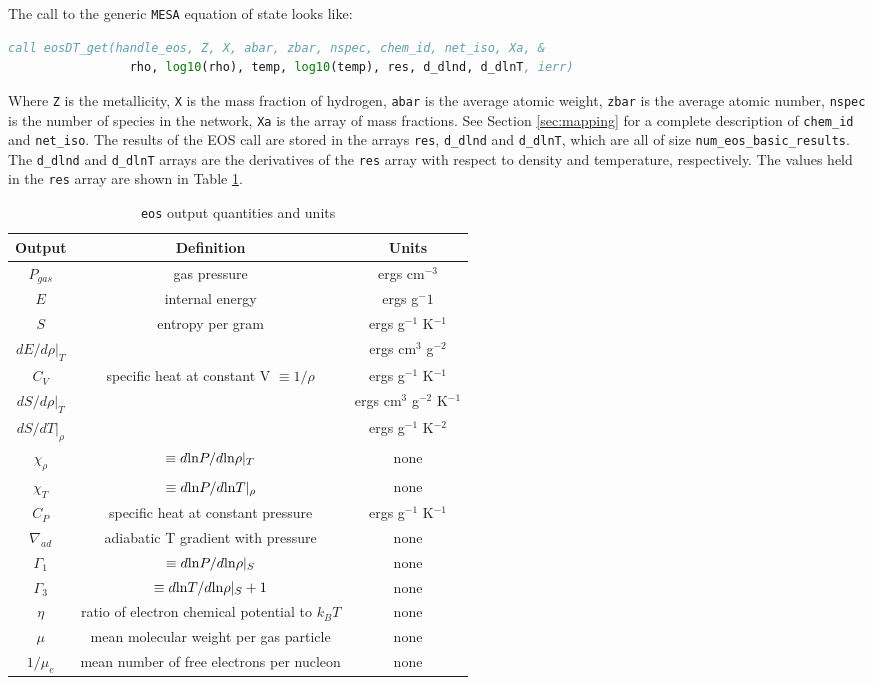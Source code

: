 The call to the generic {\tt MESA} equation of state looks like:
\begin{lstlisting}[language=fortran,mathescape=false]
  call eosDT_get(handle_eos, Z, X, abar, zbar, nspec, chem_id, net_iso, Xa, &
                 rho, log10(rho), temp, log10(temp), res, d_dlnd, d_dlnT, ierr)
\end{lstlisting}
Where {\tt Z} is the metallicity, {\tt X} is the mass fraction of hydrogen, 
{\tt abar} is the average atomic weight, {\tt zbar} is the average atomic 
number, {\tt nspec} is the number of species in the network, {\tt Xa} is 
the array of mass fractions. See Section \ref{sec:mapping} for a complete 
description of {\tt chem\_id} and {\tt net\_iso}. The results of the EOS call 
are stored in the arrays {\tt res}, {\tt d\_dlnd} and {\tt d\_dlnT}, which 
are all of size {\tt num\_eos\_basic\_results}. The {\tt d\_dlnd} and 
{\tt d\_dlnT} arrays are the derivatives of the {\tt res} array with respect 
to density and temperature, respectively. The values held in the {\tt res} 
array are shown in Table \ref{tab:res}.

\begin{table}[h]
\begin{center}
\begin{tabular}{ccc}
Output & Definition & Units \\ \hline
$P_{gas}$ & gas pressure & ergs cm$^{-3}$ \\
$E$ & internal energy & ergs g$^-{1}$ \\
$S$ & entropy per gram & ergs g$^{-1}$ K$^{-1}$ \\
$dE/d\rho|_T$ & & ergs cm$^3$ g$^{-2}$ \\
$C_V$ & specific heat at constant V $\equiv 1/\rho$ & ergs g$^{-1}$ K$^{-1}$ \\
$dS/d\rho|_T$ & & ergs cm$^3$ g$^{-2}$ K$^{-1}$ \\
$dS/dT|_\rho$ & & ergs g$^{-1}$ K$^{-2}$ \\
$\chi_\rho$ & $\equiv d{\rm ln}P/d{\rm ln}\rho|_T$ & none \\
$\chi_T$ & $\equiv d{\rm ln}P/d{\rm ln}T|_\rho$ & none \\
$C_P$ & specific heat at constant pressure & ergs g$^{-1}$ K$^{-1}$ \\
$\nabla_{ad}$ & adiabatic T gradient with pressure & none \\
$\Gamma_1$ & $\equiv d{\rm ln}P/d{\rm ln}\rho|_S$ & none \\
$\Gamma_3$ & $\equiv d{\rm ln}T/d{\rm ln}\rho|_S + 1$ & none \\
$\eta$ & ratio of electron chemical potential to $k_BT$ & none \\
$\mu$ & mean molecular weight per gas particle & none \\
$1/\mu_e$ & mean number of free electrons per nucleon & none \\ \hline
\end{tabular}
\caption{{\tt eos} output quantities and units}
\label{tab:res}
\end{center}
\end{table}

